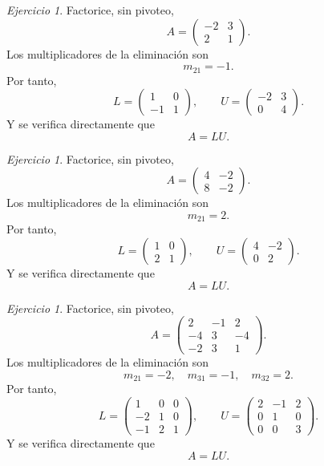 \documentclass[12pt]{article}
\theoremstyle{remark}
\newtheorem{Ejer}[definicion]{Ejercicio}
\begin{document}
\begin{Ejer}
Factorice, sin pivoteo,
\[
A=\begin{pmatrix}-2 & 3\\2 & 1\end{pmatrix}.
\]
Los multiplicadores de la eliminación son
\[
m_{21}=-1.
\]
Por tanto,
\[
L=\begin{pmatrix}1 & 0\\-1 & 1\end{pmatrix},\qquad U=\begin{pmatrix}-2 & 3\\0 & 4\end{pmatrix}.
\]
Y se verifica directamente que
\[
\boxed{A=LU}.
\]
\end{Ejer}
\begin{Ejer} Factorice, sin pivoteo,
\[
A=\begin{pmatrix}4 & -2\\8 & -2\end{pmatrix}.
\]
 Los multiplicadores de la eliminación son
\[
m_{21}=2.
\]
Por tanto,
\[
L=\begin{pmatrix}1 & 0\\2 & 1\end{pmatrix},\qquad U=\begin{pmatrix}4 & -2\\0 & 2\end{pmatrix}.
\]
Y se verifica directamente que
\[
\boxed{A=LU}.
\]
\end{Ejer}
\begin{Ejer}
Factorice, sin pivoteo,
\[
A=\begin{pmatrix}2 & -1 & 2\\-4 & 3 & -4\\-2 & 3 & 1\end{pmatrix}.
\]
Los multiplicadores de la eliminación son
\[
m_{21}=-2,\quad m_{31}=-1,\quad m_{32}=2.
\]
Por tanto,
\[
L=\begin{pmatrix}1 & 0 & 0\\-2 & 1 & 0\\-1 & 2 & 1\end{pmatrix},\qquad U=\begin{pmatrix}2 & -1 & 2\\0 & 1 & 0\\0 & 0 & 3\end{pmatrix}.
\]
Y se verifica directamente que
\[
\boxed{A=LU}.
\]

\end{Ejer}
\end{document}
